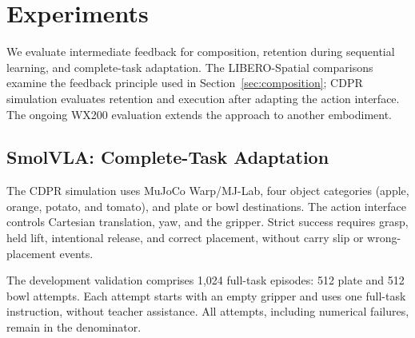 \section{Experiments}\label{sec:experiments}
We evaluate intermediate feedback for composition, retention during sequential learning, and complete-task adaptation. The LIBERO-Spatial comparisons examine the feedback principle used in Section~\ref{sec:composition}; CDPR simulation evaluates retention and execution after adapting the action interface. The ongoing WX200 evaluation extends the approach to another embodiment.




\subsection{SmolVLA: Complete-Task Adaptation}\label{sec:cdpr_results}
The CDPR simulation uses MuJoCo Warp/MJ-Lab, four object categories (apple, orange, potato, and tomato), and plate or bowl destinations. The action interface controls Cartesian translation, yaw, and the gripper. Strict success requires grasp, held lift, intentional release, and correct placement, without carry slip or wrong-placement events.

The development validation comprises 1,024 full-task episodes: 512 plate and 512 bowl attempts. Each attempt starts with an empty gripper and uses one full-task instruction, without teacher assistance. All attempts, including numerical failures, remain in the denominator.





